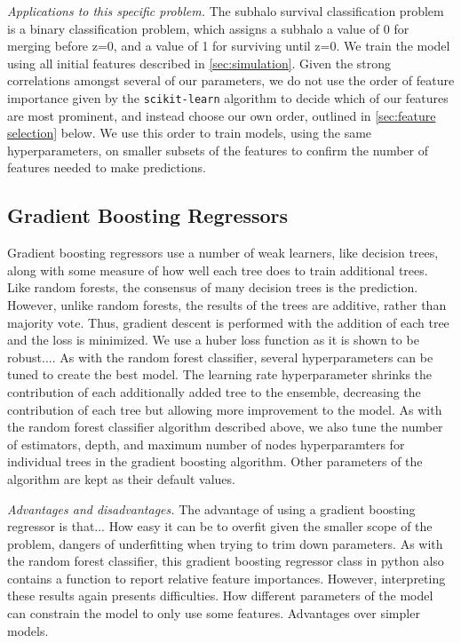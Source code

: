 \documentclass[fleqn,usenatbib]{mnras}
\begin{document}
\textit{Applications to this specific problem.} The subhalo survival classification problem is a binary classification problem, which assigns a subhalo a value of 0 for merging before z=0, and a value of 1 for surviving until z=0. We train the model using all initial features described in \ref{sec:simulation}. Given the strong correlations amongst several of our parameters, we do not use the order of feature importance given by the \texttt{scikit-learn} algorithm to decide which of our features are most prominent, and instead choose our own order, outlined in \ref{sec:feature selection} below. We use this order to train models, using the same hyperparameters, on smaller subsets of the features to confirm the number of features needed to make predictions.

\subsection{Gradient Boosting Regressors}
\label{sec:gbr} %
 Gradient boosting regressors use a number of weak learners, like decision trees, along with some measure of how well each tree does to train additional trees. Like random forests, the consensus of many decision trees is the prediction. However, unlike random forests, the results of the trees are additive, rather than majority vote. Thus, gradient descent is performed with the addition of each tree and the loss is minimized. We use a huber loss function as it is shown to be robust.... As with the random forest classifier, several hyperparameters can be tuned to create the best model. The learning rate hyperparameter shrinks the contribution of each additionally added tree to the ensemble, decreasing the contribution of each tree but allowing more improvement to the model. As with the random forest classifier algorithm described above, we also tune the number of estimators, depth, and maximum number of nodes hyperparamters for individual trees in the gradient boosting algorithm. Other parameters of the algorithm are kept as their default values.

\textit{Advantages and disadvantages.} The advantage of using a gradient boosting regressor is that... How easy it can be to overfit given the smaller scope of the problem, dangers of underfitting when trying to trim down parameters. As with the random forest classifier, this gradient boosting regressor class in python also contains a function to report relative feature importances. However, interpreting these results again presents difficulties. How different parameters of the model can constrain the model to only use some features. Advantages over simpler models.
\end{document}
